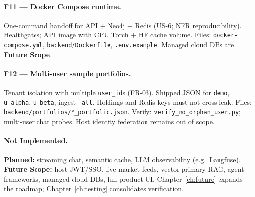 \paragraph{F11 --- Docker Compose runtime.}
One-command handoff for API + Neo4j + Redis (US-6; NFR reproducibility). Healthgates; API image with CPU Torch + HF cache volume. Files: \texttt{docker-compose.yml}, \texttt{backend/Dockerfile}, \texttt{.env.example}. Managed cloud DBs are \textbf{Future Scope}.

\paragraph{F12 --- Multi-user sample portfolios.}
Tenant isolation with multiple \texttt{user\_id}s (FR-03). Shipped JSON for \texttt{demo}, \texttt{u\_alpha}, \texttt{u\_beta}; ingest \texttt{--all}. Holdings and Redis keys must not cross-leak. Files: \texttt{backend/portfolios/*\_portfolio.json}. Verify: \texttt{verify\_no\_orphan\_user.py}; multi-user chat probes. Host identity federation remains out of scope.

\paragraph{Not Implemented.}
\textbf{Planned:} streaming chat, semantic cache, LLM observability (e.g.\ Langfuse). \textbf{Future Scope:} host JWT/SSO, live market feeds, vector-primary RAG, agent frameworks, managed cloud DBs, full product UI. Chapter~\ref{ch:future} expands the roadmap; Chapter~\ref{ch:testing} consolidates verification.
